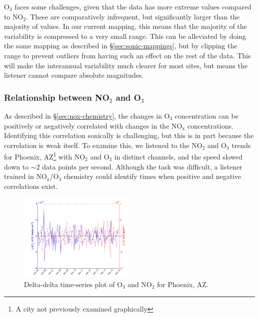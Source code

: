 \documentclass[a4paper,10pt,oneside]{article}
\newcommand{\ce}[1]{$\mathrm{#1}$}
\begin{document}
\begin{sloppy}
\ce{O_3} faces some challenges, given that the data has more extreme values compared to \ce{NO_2}. These are comparatively infrequent, but significantly larger than the majority of values.  In our current mapping, this means that the majority of the variability is compressed to a very small range. This can be alleviated by doing the same mapping as described in \S\ref{sec:sonic-mappings}, but by clipping the range to prevent outliers from having such an effect on the rest of the data.  This will make the interannual variability much clearer for most sites, but means the listener cannot compare absolute magnitudes. 
 

\subsubsection{Relationship between NO$_2$ and O$_3$}

	As described in \S\ref{sec:nox-chemistry}, the changes in \ce{O_3} concentration can be positively or negatively correlated with changes in the \ce{NO_x} concentrations. Identifying this correlation sonically is challenging, but this is in part because the correlation is weak itself. To examine this, we listened to the \ce{NO_2} and \ce{O_3} trends for Phoenix, AZ\footnote{A city not previously examined graphically} with \ce{NO_2} and \ce{O_3} in distinct channels, and the speed slowed down to $\sim 2$ data points per second.  Although the task was difficult, a listener trained in \ce{NO_x}/\ce{O_3} chemistry could identify times when positive and negative correlations exist.  
	
	\begin{figure}
	\centering
	\includegraphics[width=0.5\textwidth]{figs/delta-delta-timeser-phoenix_AZ.png} 
	\caption{Delta-delta time-series plot of \ce{O_3} and \ce{NO_2} for Phoenix, AZ.}
	\label{fig:del-del}
	\end{figure}
	

\end{sloppy}
\end{document}
